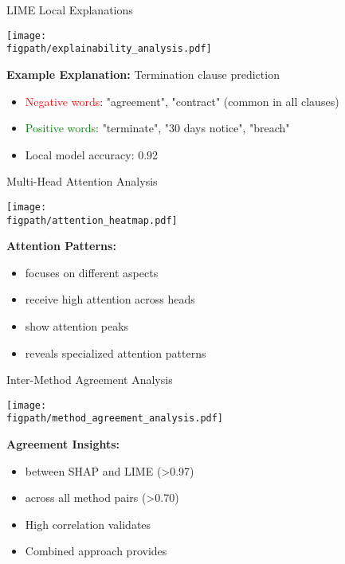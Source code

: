 \begin{frame}{LIME Local Explanations}
\begin{center}
\texttt{[image: \\figpath/explainability\_analysis.pdf]}
\end{center}

\textbf{Example Explanation:} Termination clause prediction
\begin{itemize}
    \item \textcolor{red}{Negative words}: "agreement", "contract" (common in all clauses)
    \item \textcolor{green}{Positive words}: "terminate", "30 days notice", "breach"
    \item Local model accuracy: 0.92
\end{itemize}
\end{frame}

\begin{frame}{Multi-Head Attention Analysis}
\begin{center}
\texttt{[image: \\figpath/attention\_heatmap.pdf]}
\end{center}

\textbf{Attention Patterns:}
\begin{itemize}
    \item {} focuses on different aspects
    \item {} receive high attention across heads
    \item {} show attention peaks
    \item {} reveals specialized attention patterns
\end{itemize}
\end{frame}

\begin{frame}{Inter-Method Agreement Analysis}
\begin{center}
\texttt{[image: \\figpath/method\_agreement\_analysis.pdf]}
\end{center}

\textbf{Agreement Insights:}
\begin{itemize}
    \item {} between SHAP and LIME (>0.97)
    \item {} across all method pairs (>0.70)
    \item High correlation validates 
    \item Combined approach provides 
\end{itemize}
\end{frame}

